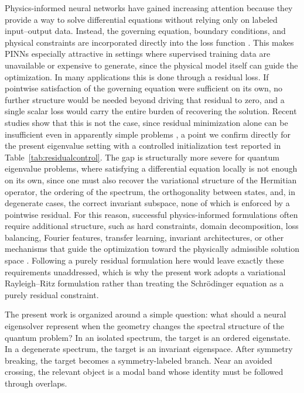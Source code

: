 \documentclass[10pt,onecolumn]{article}
\begin{document}
Physics-informed neural networks have gained increasing attention because they provide a way to solve differential equations without relying only on labeled input--output data. Instead, the governing equation, boundary conditions, and physical constraints are incorporated directly into the loss function \cite{Lagaris1998,Raissi2019,Karniadakis2021}. This makes PINNs especially attractive in settings where supervised training data are unavailable or expensive to generate, since the physical model itself can guide the optimization. In many applications this is done through a residual loss. If pointwise satisfaction of the governing equation were sufficient on its own, no further structure would be needed beyond driving that residual to zero, and a single scalar loss would carry the entire burden of recovering the solution. Recent studies show that this is not the case, since residual minimization alone can be insufficient even in apparently simple problems \cite{Krishnapriyan2021}, a point we confirm directly for the present eigenvalue setting with a controlled initialization test reported in Table~\ref{tab:residualcontrol}. The gap is structurally more severe for quantum eigenvalue problems, where satisfying a differential equation locally is not enough on its own, since one must also recover the variational structure of the Hermitian operator, the ordering of the spectrum, the orthogonality between states, and, in degenerate cases, the correct invariant subspace, none of which is enforced by a pointwise residual. For this reason, successful physics-informed formulations often require additional structure, such as hard constraints, domain decomposition, loss balancing, Fourier features, transfer learning, invariant architectures, or other mechanisms that guide the optimization toward the physically admissible solution space \cite{Khademi2024,Mao2025,Zhong2023,Lei2025,Arora2024}. Following a purely residual formulation here would leave exactly these requirements unaddressed, which is why the present work adopts a variational Rayleigh--Ritz formulation rather than treating the Schrödinger equation as a purely residual constraint.

The present work is organized around a simple question: what should a neural eigensolver represent when the geometry changes the spectral structure of the quantum problem? In an isolated spectrum, the target is an ordered eigenstate. In a degenerate spectrum, the target is an invariant eigenspace. After symmetry breaking, the target becomes a symmetry-labeled branch. Near an avoided crossing, the relevant object is a modal band whose identity must be followed through overlaps.
\end{document}
